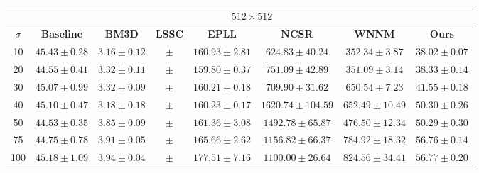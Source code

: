 \documentclass[10pt,twocolumn,letterpaper]{article}
\begin{document}
\begin{table*}[t]
\begin{center}
\begin{tabular}{|c||c|c|c|c|c|c|c|}
\\
\hline
\hline
&\multicolumn{7}{c|}{ $512 \times 512$}
\\
\hline
\hline
$\sigma$&\textbf{Baseline} &\textbf{BM3D}&\textbf{LSSC}&\textbf{EPLL}&\textbf{NCSR}&\textbf{WNNM}&\textbf{Ours} 
\\
\hline
  10&$45.43\pm0.28$  &$3.16\pm0.12$ & $  \pm $  &  $160.93\pm2.81$  & $624.83\pm40.24$   &  $352.34\pm3.87$  &  $38.02\pm0.07$   
\\
\hline
20&$44.55\pm0.41$ &$3.32\pm0.11$ & $  \pm $  &  $159.80\pm0.37$  & $751.09\pm42.89$   &  $351.09\pm3.14$  &  $38.33\pm0.14$   
\\
\hline 
 30 &$45.07\pm0.99$ &$3.32\pm0.09$ & $  \pm $  &  $160.21\pm0.18$  & $709.90\pm31.62$   &  $650.54\pm7.23$  &  $41.55\pm0.18$  
\\
\hline
 40&$45.10\pm0.47$  & $3.18\pm0.18$ & $  \pm $  &  $160.23\pm0.17$  & $1620.74\pm104.59$   &  $652.49\pm10.49$  &  $50.30\pm0.26$   
\\
\hline
 50&$44.53\pm0.35$  & $3.85\pm0.09$ & $  \pm $  &  $161.36\pm3.08$  & $1492.78\pm65.87 $   &  $476.50\pm12.34$  &  $50.29\pm0.30$    
\\
\hline
 75&$44.75\pm0.78$  & $3.91\pm0.05$ & $  \pm $  &  $165.66\pm2.62 $  & $1156.82\pm66.37$   &  $784.92\pm18.32$  &  $56.76\pm0.14$  
\\
\hline
 100&$45.18\pm1.09$  & $3.94\pm0.04$ & $  \pm $  &  $177.51\pm7.16$  & $1100.00\pm26.64$   &  $824.56\pm34.41$  &  $56.77\pm0.20$    
\\
\hline
\end{tabular}
\end{center}
\end{table*}
\end{document}

